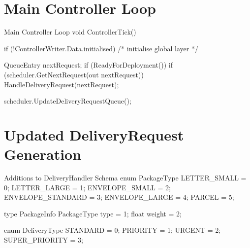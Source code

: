 \documentclass[a4paper,12pt,titlepage]{article}
\begin{document}
\begin{appendices}
\section{Main Controller Loop}
\begin{sexylisting}[colback=white]{Main Controller Loop}
void ControllerTick()
{
  if (!ControllerWriter.Data.initialised)
  {
    /* initialise global layer */
  }

  QueueEntry nextRequest;
  if (ReadyForDeployment())
  {
    if (scheduler.GetNextRequest(out nextRequest))
    {
      HandleDeliveryRequest(nextRequest);
    }
  }

  scheduler.UpdateDeliveryRequestQueue();
}
\end{sexylisting}

\section{Updated DeliveryRequest Generation}
\begin{sexylisting}[colback=white]{Additions to DeliveryHandler Schema}
enum PackageType {
  LETTER_SMALL = 0;
  LETTER_LARGE = 1;
  ENVELOPE_SMALL = 2;
  ENVELOPE_STANDARD = 3;
  ENVELOPE_LARGE = 4;
  PARCEL = 5;
}

type PackageInfo {
  PackageType type = 1;
  float weight = 2;
}

enum DeliveryType {
  STANDARD = 0;
  PRIORITY = 1;
  URGENT = 2;
  SUPER_PRIORITY = 3;
}
\end{sexylisting}

\end{appendices}
\end{document}
